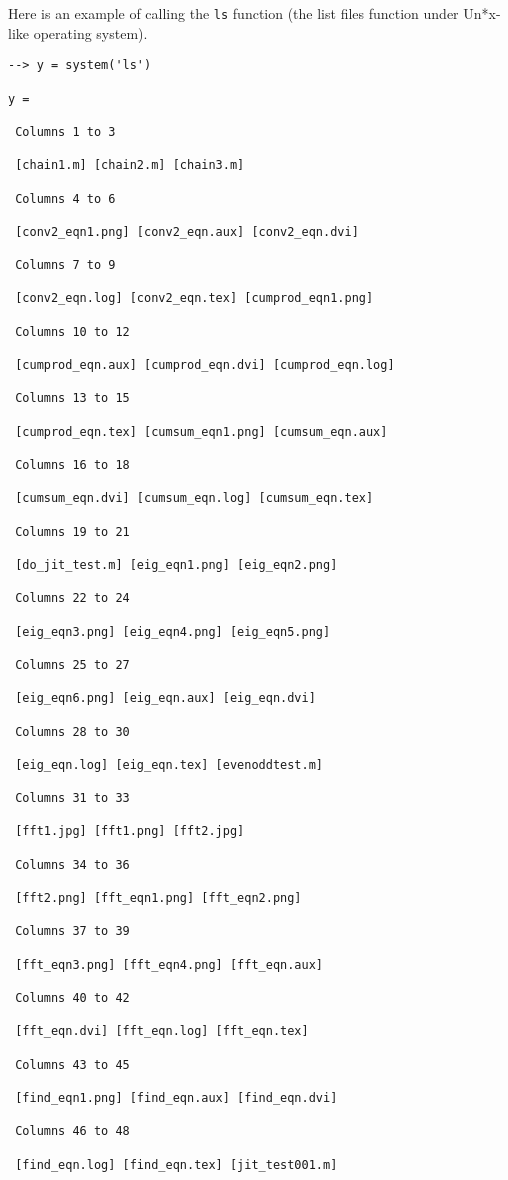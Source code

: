 Here is an example of calling the \verb|ls| function (the
list files function under Un*x-like operating system).
\begin{verbatim}
--> y = system('ls')

y = 

 Columns 1 to 3

 [chain1.m] [chain2.m] [chain3.m] 

 Columns 4 to 6

 [conv2_eqn1.png] [conv2_eqn.aux] [conv2_eqn.dvi] 

 Columns 7 to 9

 [conv2_eqn.log] [conv2_eqn.tex] [cumprod_eqn1.png] 

 Columns 10 to 12

 [cumprod_eqn.aux] [cumprod_eqn.dvi] [cumprod_eqn.log] 

 Columns 13 to 15

 [cumprod_eqn.tex] [cumsum_eqn1.png] [cumsum_eqn.aux] 

 Columns 16 to 18

 [cumsum_eqn.dvi] [cumsum_eqn.log] [cumsum_eqn.tex] 

 Columns 19 to 21

 [do_jit_test.m] [eig_eqn1.png] [eig_eqn2.png] 

 Columns 22 to 24

 [eig_eqn3.png] [eig_eqn4.png] [eig_eqn5.png] 

 Columns 25 to 27

 [eig_eqn6.png] [eig_eqn.aux] [eig_eqn.dvi] 

 Columns 28 to 30

 [eig_eqn.log] [eig_eqn.tex] [evenoddtest.m] 

 Columns 31 to 33

 [fft1.jpg] [fft1.png] [fft2.jpg] 

 Columns 34 to 36

 [fft2.png] [fft_eqn1.png] [fft_eqn2.png] 

 Columns 37 to 39

 [fft_eqn3.png] [fft_eqn4.png] [fft_eqn.aux] 

 Columns 40 to 42

 [fft_eqn.dvi] [fft_eqn.log] [fft_eqn.tex] 

 Columns 43 to 45

 [find_eqn1.png] [find_eqn.aux] [find_eqn.dvi] 

 Columns 46 to 48

 [find_eqn.log] [find_eqn.tex] [jit_test001.m] 


\end{verbatim}
